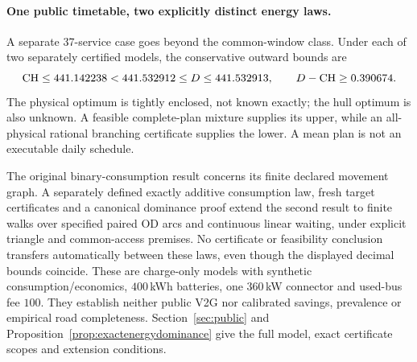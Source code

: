 \paragraph{One public timetable, two explicitly distinct energy laws.}
A separate 37-service case goes beyond the common-window class. Under
each of two separately certified models, the conservative outward bounds are
\[
 \mathrm{CH}\le441.142238<441.532912\le D\le441.532913,
 \qquad D-\mathrm{CH}\ge0.390674.
\]
The physical optimum is tightly enclosed, not known exactly; the hull
optimum is also unknown. A feasible complete-plan mixture supplies its
upper, while an all-physical rational branching certificate supplies the
lower. A mean plan is not an executable daily schedule.

The original binary-consumption result concerns its finite declared
movement graph. A separately defined exactly additive consumption law,
fresh target certificates and a canonical dominance proof extend the
second result to finite walks over specified paired OD arcs and continuous
linear waiting, under explicit triangle and common-access premises. No
certificate or feasibility conclusion transfers automatically between
these laws, even though the displayed decimal bounds coincide. These
are charge-only models with synthetic consumption/economics, $400$\,kWh
batteries, one $360$\,kW connector and used-bus fee $100$. They establish neither
public V2G nor calibrated savings, prevalence or empirical road completeness.
Section~\ref{sec:public} and Proposition~\ref{prop:exactenergydominance}
give the full model, exact certificate scopes and extension conditions.
